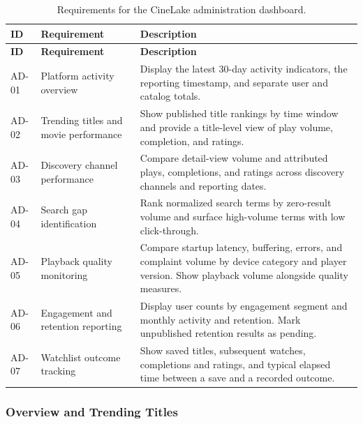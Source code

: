 \documentclass[a4paper,12pt]{article}
\begin{document}
\begingroup
\small
\setlength{\tabcolsep}{4pt}
\renewcommand{\arraystretch}{1.15}
\begin{longtable}{@{}>{\raggedright\arraybackslash}p{}
                    >{\raggedright\arraybackslash}p{}
                    >{\raggedright\arraybackslash}p{}@{}}
\caption{Requirements for the CineLake administration dashboard.}
\label{tab:admin-business-requirements}\\
\toprule
\textbf{ID} & \textbf{Requirement} & \textbf{Description}\\
\midrule
\endfirsthead
\toprule
\textbf{ID} & \textbf{Requirement} & \textbf{Description}\\
\midrule
\endhead
\bottomrule
\endfoot
AD-01 & Platform activity overview &
Display the latest 30-day activity indicators, the reporting timestamp,
and separate user and catalog totals.\\
AD-02 & Trending titles and movie performance &
Show published title rankings by time window and provide a title-level
view of play volume, completion, and ratings.\\
AD-03 & Discovery channel performance &
Compare detail-view volume and attributed plays, completions, and
ratings across discovery channels and reporting dates.\\
AD-04 & Search gap identification &
Rank normalized search terms by zero-result volume and surface
high-volume terms with low click-through.\\
AD-05 & Playback quality monitoring &
Compare startup latency, buffering, errors, and complaint volume by
device category and player version. Show playback volume alongside
quality measures.\\
AD-06 & Engagement and retention reporting &
Display user counts by engagement segment and monthly activity and
retention. Mark unpublished retention results as pending.\\
AD-07 & Watchlist outcome tracking &
Show saved titles, subsequent watches, completions and ratings, and
typical elapsed time between a save and a recorded outcome.\\
\end{longtable}
\endgroup

\subsubsection{Overview and Trending Titles}
\end{document}

